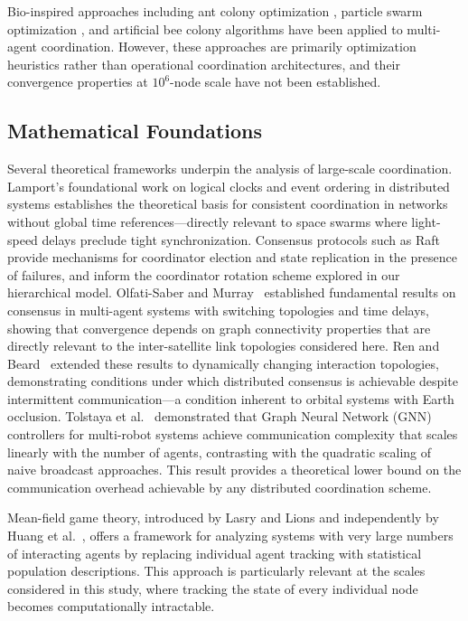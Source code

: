 \documentclass[journal]{IEEEtran}
\begin{document}
Bio-inspired approaches including ant colony optimization \cite{dorigo_aco}, particle swarm optimization \cite{kennedy_pso}, and artificial bee colony algorithms \cite{karaboga_abc} have been applied to multi-agent coordination. However, these approaches are primarily optimization heuristics rather than operational coordination architectures, and their convergence properties at $10^6$-node scale have not been established.

\subsection{Mathematical Foundations}

Several theoretical frameworks underpin the analysis of large-scale coordination. Lamport's foundational work on logical clocks and event ordering in distributed systems \cite{lamport_clocks} establishes the theoretical basis for consistent coordination in networks without global time references---directly relevant to space swarms where light-speed delays preclude tight synchronization. Consensus protocols such as Raft \cite{ongaro_raft} provide mechanisms for coordinator election and state replication in the presence of failures, and inform the coordinator rotation scheme explored in our hierarchical model. Olfati-Saber and Murray~\cite{olfati_consensus} established fundamental results on consensus in multi-agent systems with switching topologies and time delays, showing that convergence depends on graph connectivity properties that are directly relevant to the inter-satellite link topologies considered here. Ren and Beard~\cite{ren_beard} extended these results to dynamically changing interaction topologies, demonstrating conditions under which distributed consensus is achievable despite intermittent communication---a condition inherent to orbital systems with Earth occlusion. Tolstaya et al.~\cite{tolstaya_gnn} demonstrated that Graph Neural Network (GNN) controllers for multi-robot systems achieve communication complexity that scales linearly with the number of agents, contrasting with the quadratic scaling of naive broadcast approaches. This result provides a theoretical lower bound on the communication overhead achievable by any distributed coordination scheme.

Mean-field game theory, introduced by Lasry and Lions \cite{lasry_mfg} and independently by Huang et al.~\cite{huang_mfg}, offers a framework for analyzing systems with very large numbers of interacting agents by replacing individual agent tracking with statistical population descriptions. This approach is particularly relevant at the scales considered in this study, where tracking the state of every individual node becomes computationally intractable.
\end{document}
